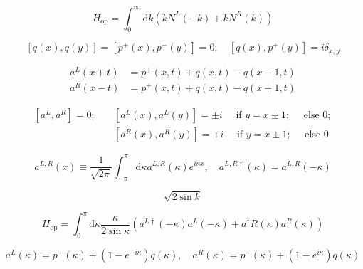 \documentclass[main.tex]{subfiles}
\begin{document}
\begin{equation}\label{17.13}
	H_{\mathrm{op}}=\int_{0}^{\infty} \mathrm{d} k\left(k N^{L}(-k)+k N^{R}(k)\right)
\end{equation}

\begin{equation}\label{17.14}
	[q(x), q(y)]=\left[p^{+}(x), p^{+}(y)\right]=0 ; \quad\left[q(x), p^{+}(y)\right]=i \delta_{x, y}
\end{equation}

\begin{equation}\label{17.15}
	\begin{aligned} a^{L}(x+t) &=p^{+}(x, t)+q(x, t)-q(x-1, t) \\ a^{R}(x-t) &=p^{+}(x, t)+q(x, t)-q(x+1, t) \end{aligned}
\end{equation}

\begin{equation}\label{17.17}
	\begin{aligned}\left[a^{L}, a^{R}\right]=0 ; \quad &\left[a^{L}(x), a^{L}(y)\right]=\pm i \quad \text { if } y=x \pm 1 ; \quad \text { else } 0 ; \\ &\left[a^{R}(x), a^{R}(y)\right]=\mp i \quad \text { if } y=x \pm 1 ; \quad \text { else } 0 \end{aligned}
\end{equation}

\begin{equation}\label{17.19}
	a^{L, R}(x) \equiv \frac{1}{\sqrt{2 \pi}} \int_{-\pi}^{\pi} \mathrm{d} \kappa a^{L, R}(\kappa) e^{i \kappa x}, \quad a^{L, R \dagger}(\kappa)=a^{L, R}(-\kappa)
\end{equation}







\begin{equation}\label{17.22}
	\sqrt{2\sin k}
\end{equation}



\begin{equation}\label{17.23}
	H_{\mathrm{op}}=\int_{0}^{\pi} \mathrm{d} \kappa \frac{\kappa}{2 \sin \kappa}\left(a^{L \dagger}(-\kappa) a^{L}(-\kappa)+a^{\dagger} R(\kappa) a^{R}(\kappa)\right)
\end{equation}



\begin{equation}\label{17.24}
	a^{L}(\kappa)=p^{+}(\kappa)+\left(1-e^{-i \kappa}\right) q(\kappa), \quad a^{R}(\kappa)=p^{+}(\kappa)+\left(1-e^{i \kappa}\right) q(\kappa)
\end{equation}
\end{document}
